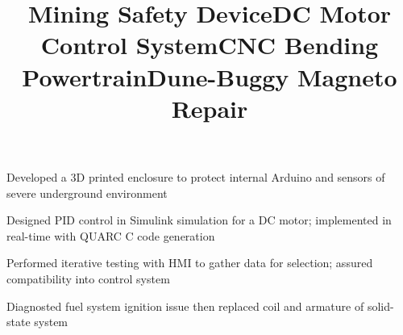 \documentclass[mm]{res}
\newcommand{\tb}{\textbullet \xspace}
\begin{document}
\begin{resume}
\title{\textbf{Mining Safety Device}}
\begin{position}
\tb Developed a 3D printed enclosure to protect internal Arduino and sensors of severe underground environment
\end{position}

\title{\textbf{DC Motor Control System}}
\begin{position}
\tb Designed PID control in Simulink simulation for a DC motor; implemented in real-time with QUARC C code generation
\end{position}

\title{\textbf{CNC Bending Powertrain}}
\begin{position}
\tb Performed iterative testing with HMI to gather data for selection; assured compatibility into control system
\end{position}

\title{\textbf{Dune-Buggy Magneto Repair}}
\begin{position}
\tb Diagnosted fuel system ignition issue then replaced coil and armature of solid-state system
\end{position}

%



\end{resume}
\end{document}

